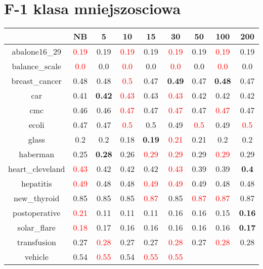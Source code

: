 \documentclass{article}%
\begin{document}
\section*{F{-}1 klasa mniejszosciowa}%
\begin{tabular}{c|cccccccc}%
\hline%
&NB&5&10&15&30&50&100&200\\%
\hline%
abalone16\_29&\textcolor{red}{ 
0.19
}&0.19&\textcolor{red}{ 
0.19
}&0.19&\textcolor{red}{ 
0.19
}&0.19&\textcolor{red}{ 
0.19
}&0.19\\%
\hline%
balance\_scale&\textcolor{red}{ 
0.0
}&0.0&\textcolor{red}{ 
0.0
}&0.0&\textcolor{red}{ 
0.0
}&0.0&\textcolor{red}{ 
0.0
}&0.0\\%
\hline%
breast\_cancer&0.48&0.48&\textcolor{red}{ 
0.5
}&0.47&\textbf{0.49}&0.47&\textbf{0.48}&0.47\\%
\hline%
car&0.41&\textbf{0.42}&\textcolor{red}{ 
0.43
}&0.43&\textcolor{red}{ 
0.43
}&0.42&0.42&0.42\\%
\hline%
cmc&0.46&0.46&\textcolor{red}{ 
0.47
}&0.47&\textcolor{red}{ 
0.47
}&0.47&\textcolor{red}{ 
0.47
}&0.47\\%
\hline%
ecoli&0.47&0.47&\textcolor{red}{ 
0.5
}&0.5&0.49&\textcolor{red}{ 
0.5
}&0.49&\textcolor{red}{ 
0.5
}\\%
\hline%
glass&0.2&0.2&0.18&\textbf{0.19}&\textcolor{red}{ 
0.21
}&0.21&0.2&0.2\\%
\hline%
haberman&0.25&\textbf{0.28}&0.26&\textcolor{red}{ 
0.29
}&\textcolor{red}{ 
0.29
}&0.29&\textcolor{red}{ 
0.29
}&0.29\\%
\hline%
heart\_cleveland&\textcolor{red}{ 
0.43
}&0.42&0.42&0.42&\textcolor{red}{ 
0.43
}&0.39&0.39&\textbf{0.4}\\%
\hline%
hepatitis&\textcolor{red}{ 
0.49
}&0.48&0.48&\textcolor{red}{ 
0.49
}&\textcolor{red}{ 
0.49
}&0.49&0.48&0.48\\%
\hline%
new\_thyroid&0.85&0.85&0.85&\textcolor{red}{ 
0.87
}&0.85&\textcolor{red}{ 
0.87
}&\textcolor{red}{ 
0.87
}&0.87\\%
\hline%
postoperative&\textcolor{red}{ 
0.21
}&0.11&0.11&0.11&0.16&0.16&0.15&\textbf{0.16}\\%
\hline%
solar\_flare&\textcolor{red}{ 
0.18
}&0.17&0.16&0.16&0.16&0.16&0.16&\textbf{0.17}\\%
\hline%
transfusion&0.27&\textcolor{red}{ 
0.28
}&0.27&0.27&\textcolor{red}{ 
0.28
}&0.27&\textcolor{red}{ 
0.28
}&0.28\\%
\hline%
vehicle&0.54&\textcolor{red}{ 
0.55
}&0.54&\textcolor{red}{ 
0.55
}&\textcolor{red}{ 
0.55
}
\end{tabular}
\end{document}
